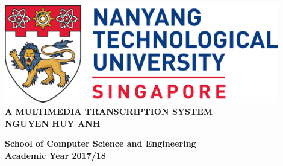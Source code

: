 \begin{titlepage}
\begin{center}

\includegraphics[width=0.9\textwidth]{../images/ntu_logo.png}
\\[6cm]

\uppercase{
    \textbf{A Multimedia Transcription System}
    \\[5cm]
    \textbf{Nguyen Huy Anh}
}

\vfill

\textbf{School of Computer Science and Engineering}\\
\textbf{Academic Year 2017/18}

\end{center}
\end{titlepage}
